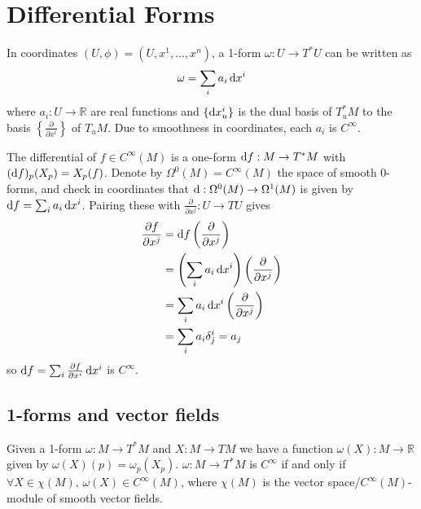 \section{Differential Forms}

In coordinates $(U, \phi) = (U, x^1, \dots, x^n)$, a
1-form $\omega : U \to T^\ast U$ can be written as
$$
\omega = \sum_i a_i \mathop{}\!\mathrm{d} x^i
$$
where $a_i : U \to \mathbb{R}$ are real functions and
$\{ \mathop{}\!\mathrm{d} x^i_u \}$ is the dual basis of $T_u^\ast M$ to the basis
$\left\{ \frac{\partial}{\partial x^i} \right\}$ of $T_u M$.
Due to smoothness in coordinates, each $a_i$ is $C^\infty$.

The differential of $f \in C^\infty(M)$
is a one-form $\mathop{}\!\mathrm{d} f: M \to T^\ast M$ with
$(\mathop{}\!\mathrm{d} f)_p(X_p) = X_p(f)$. Denote by
$\Omega^0(M) = C^\infty(M)$ the space of smooth 0-forms, and check
in coordinates that $\mathop{}\!\mathrm{d} : \Omega^0(M) \to \Omega^1(M)$ is given by
$\mathop{}\!\mathrm{d} f = \sum_i a_i \mathop{}\!\mathrm{d} x^i$. Pairing these with
$\frac{\partial}{\partial x^j} : U \to TU$ gives
\begin{align*}
   \frac{\partial f}{\partial x^j}
&= \mathop{}\!\mathrm{d} f \left( \frac{\partial}{\partial x^j} \right) \\
&= \left(
     \sum_i a_i \mathop{}\!\mathrm{d} x^i
   \right)
   \left(
     \frac{\partial}{\partial x^j}
   \right) \\
&= \sum_i a_i \mathop{}\!\mathrm{d} x^i
     \left(
       \frac{\partial}{\partial x^j}
     \right) \\
&= \sum_i
     a_i \delta^i_j = a_j
\end{align*}
so $\mathop{}\!\mathrm{d} f = \sum_i \frac{\partial f}{\partial x^i} \mathop{}\!\mathrm{d} x^i$ is
$C^\infty$.

\subsection{1-forms and vector fields}
\begin{prop}
Given a 1-form $\omega: M \to T^\ast M$ and $X: M \to TM$ we have a
function
$\omega(X) : M \to \mathbb{R}$ given by
$\omega(X)(p) = \omega_p (X_p)$.
$\omega : M \to T^\ast M$ is $C^\infty$ if and only if
$\forall X \in \chi(M)$,
$\omega(X) \in C^\infty(M)$, where
$\chi(M)$ is the vector space/$C^\infty(M)$-module of smooth vector fields.
\end{prop}


